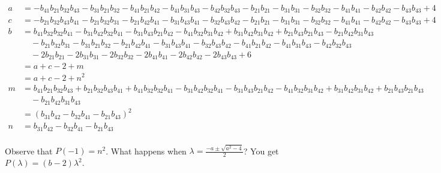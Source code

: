 \documentclass{amsart}
\numberwithin{theorem}{section}
\begin{document}
  \begin{align*}
    a
    &=-b_{41}b_{21}b_{32}b_{43}-b_{31}b_{21}b_{32}-b_{41}b_{21}b_{42}-b_{41}b_{31}b_{43}-b_{42}b_{32}b_{43}-b_{21}b_{21}-b_{31}b_{31}-b_{32}b_{32}-b_{41}b_{41}-b_{42}b_{42}-b_{43}b_{43}+4\\
    c
    &=-b_{21}b_{32}b_{43}b_{41}-b_{21}b_{32}b_{31}-b_{21}b_{42}b_{41}-b_{31}b_{43}b_{41}-b_{32}b_{43}b_{42}-b_{21}b_{21}-b_{31}b_{31}-b_{32}b_{32}-b_{41}b_{41}-b_{42}b_{42}-b_{43}b_{43}+4\\
    b
    &=b_{41} b_{32} b_{32} b_{41} - b_{31} b_{42} b_{32} b_{41} - b_{31} b_{43} b_{21} b_{42} - b_{41} b_{32} b_{31} b_{42} + b_{31} b_{42} b_{31} b_{42} + b_{21} b_{43} b_{21} b_{43} - b_{21} b_{42} b_{31} b_{43}\\
    &\quad - b_{21} b_{32} b_{31} - b_{31} b_{21} b_{32} - b_{21} b_{42} b_{41} - b_{31} b_{43} b_{41} - b_{32} b_{43} b_{42} - b_{41} b_{21} b_{42} - b_{41} b_{31} b_{43} - b_{42} b_{32} b_{43}\\
    &\quad - 2 b_{21} b_{21} - 2 b_{31} b_{31} - 2 b_{32} b_{32} - 2 b_{41} b_{41} - 2 b_{42} b_{42} - 2 b_{43} b_{43} + 6\\
    &=a+c-2+m\\
    &=a+c-2+n^2\\
    m
    &=b_{41}b_{21}b_{32}b_{43}+b_{21}b_{32}b_{43}b_{41}+b_{41}b_{32}b_{32}b_{41}-b_{31}b_{42}b_{32}b_{41}-b_{31}b_{43}b_{21}b_{42}-b_{41}b_{32}b_{31}b_{42}+b_{31}b_{42}b_{31}b_{42}+b_{21}b_{43}b_{21}b_{43}\\
    &\quad -b_{21}b_{42}b_{31}b_{43}\\
    &=(b_{31}b_{42}-b_{32}b_{41}-b_{21}b_{43})^2\\
    n
    &=b_{31}b_{42}-b_{32}b_{41}-b_{21}b_{43}\\
  \end{align*}

  Observe that $P(-1)=n^2$.
  What happens when $\lambda=\frac{-a\pm\sqrt{a^2-4}}{2}$?  You get $P(\lambda)=(b-2)\lambda^2$.
    
\end{document}
